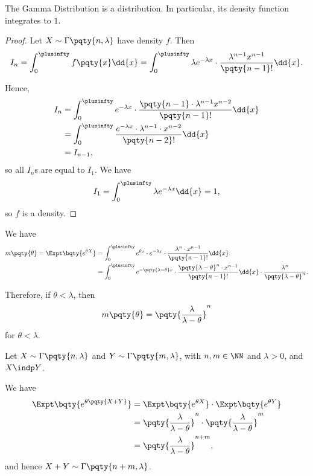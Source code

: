 \begin{proposition}
    \label{prop:gamma-distribution-integral}%
    The Gamma Distribution is a distribution. In particular, its density function integrates to \(1\).
\end{proposition}

\begin{proof}
    Let \(X \sim \Gamma\pqty{n, \lambda}\) have density \(f\). Then
    \[
        I_n = \int_{0}^{\plusinfty} f\pqty{x} \dd{x} = \int_{0}^{\plusinfty}  \lambda e^{-\lambda x} \cdot \frac{\lambda^{n - 1} x^{n - 1}}{\pqty{n - 1}!} \dd{x}.
    \]

    Hence,
    \begin{align*}
        I_n &= \int_{0}^{\plusinfty} e^{-\lambda x} \cdot \frac{\pqty{n - 1} \cdot \lambda^{n - 1} x^{n - 2}}{\pqty{n - 1}!} \dd{x} \\
        &= \int_{0}^{\plusinfty} \frac{e^{-\lambda x} \cdot \lambda^{n - 1} \cdot x^{n - 2}}{\pqty{n - 2}!} \dd{x} \\
        &= I_{n - 1},
    \end{align*}
    so all \(I_n\)s are equal to \(I_1\). We have
    \[
        I_1 = \int_{0}^{\plusinfty} \lambda e^{-\lambda x} \dd{x} = 1,
    \]
    so \(f\) is a density.
\end{proof}

\begin{example}
    \label{ex:gamma-distribution-mgf}%
    We have
    \begin{align*}
        m\pqty{\theta} = \Expt\bqty{e^{\theta X}} &= \int_{0}^{\plusinfty} e^{\theta x} \cdot e^{- \lambda x} \cdot \frac{\lambda^n \cdot x^{n - 1}}{\pqty{n - 1}!} \dd{x} \\
        &= \int_{0}^{\plusinfty} e^{- \pqty{\lambda - \theta} x} \cdot \frac{\pqty{\lambda - \theta}^n \cdot x^{n - 1}}{\pqty{n - 1}!} \dd{x} \cdot \frac{\lambda^n}{\pqty{\lambda - \theta}^n}.
    \end{align*}

    Therefore, if \(\theta < \lambda\), then
    \[
        m \pqty{\theta} = \pqty{\frac{\lambda}{\lambda - \theta}}^n
    \]
    for \(\theta < \lambda\).
\end{example}

\begin{example}
    \label{ex:sum-gamma}%
    Let \(X \sim \Gamma\pqty{n, \lambda}\) and \(Y \sim \Gamma\pqty{m, \lambda}\), with \(n, m \in \NN\) and \(\lambda > 0\), and \(X \indp Y\).

    We have
    \begin{align*}
        \Expt\bqty{e^{\theta \pqty{X + Y}}} &= \Expt\bqty{e^{\theta X}} \cdot \Expt\bqty{e^{\theta Y}} \\
        &= \pqty{\frac{\lambda}{\lambda - \theta}}^n \cdot \pqty{\frac{\lambda}{\lambda - \theta}}^m \\
        &= \pqty{\frac{\lambda}{\lambda - \theta}}^{n + m},
    \end{align*}
    and hence \(X + Y \sim \Gamma\pqty{n + m, \lambda}\).
\end{example}

